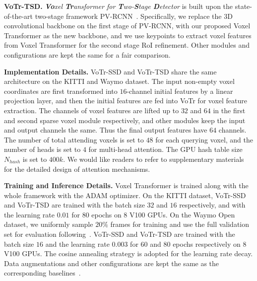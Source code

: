 \documentclass[10pt,twocolumn,letterpaper]{article}
\begin{document}
\noindent\textbf{VoTr-TSD.} \textit{\textbf{Vo}xel \textbf{Tr}ansformer for \textbf{T}wo-\textbf{S}tage \textbf{D}etector} is built upon the state-of-the-art two-stage framework PV-RCNN~\cite{shi2020pv}. Specifically, we replace the 3D convolutional backbone on the first stage of PV-RCNN, with our proposed Voxel Transformer as the new backbone, and we use keypoints to extract voxel features from Voxel Transformer for the second stage RoI refinement. Other modules and configurations are kept the same for a fair comparison.

\noindent\textbf{Implementation Details.} VoTr-SSD and VoTr-TSD share the same architecture on the KITTI and Waymo dataset. The input non-empty voxel coordinates are first transformed into $16$-channel initial features by a linear projection layer, and then the initial features are fed into VoTr for voxel feature extraction. The channels of voxel features are lifted up to $32$ and $64$ in the first and second sparse voxel module respectively, and other modules keep the input and output channels the same. Thus the final output features have $64$ channels. The number of total attending voxels is set to $48$ for each querying voxel, and the number of heads is set to $4$ for multi-head attention. The GPU hash table size $N_{hash}$ is set to $400k$. We would like readers to refer to supplementary materials for the detailed design of attention mechanisms.

\noindent\textbf{Training and Inference Details.} Voxel Transformer is trained along with the whole framework with the ADAM optimizer. On the KITTI dataset, VoTr-SSD and VoTr-TSD are trained with the batch size $32$ and $16$ respectively, and with the learning rate $0.01$ for $80$ epochs on $8$ V100 GPUs. On the Waymo Open dataset, we uniformly sample $20\%$ frames for training and use the full validation set for evaluation following~\cite{shi2020pv}. VoTr-SSD and VoTr-TSD are trained with the batch size $16$ and the learning rate $0.003$ for $60$ and $80$ epochs respectively on $8$ V100 GPUs. The cosine annealing strategy is adopted for the learning rate decay. Data augmentations and other configurations are kept the same as the corresponding baselines~\cite{yan2018second, shi2020pv}.
\end{document}
